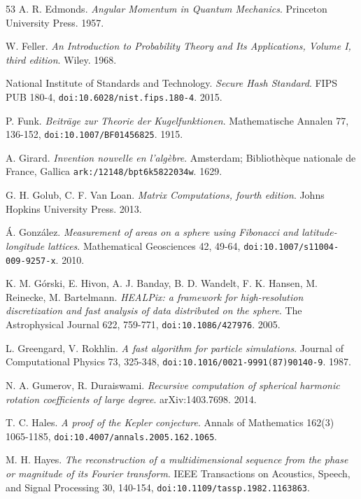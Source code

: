 \begin{thebibliography}{53}
A. R. Edmonds. \emph{Angular Momentum in Quantum Mechanics}. Princeton University Press. 1957.

W. Feller. \emph{An Introduction to Probability Theory and Its Applications, Volume I, third edition}. Wiley. 1968.

National Institute of Standards and Technology. \emph{Secure Hash Standard}. FIPS PUB 180-4, \texttt{doi:10.6028/\allowbreak{}nist.fips.180-4}. 2015.

P. Funk. \emph{Beiträge zur Theorie der Kugelfunktionen}. Mathematische Annalen 77, 136-152, \texttt{doi:10.1007/\allowbreak{}BF01456825}. 1915.

A. Girard. \emph{Invention nouvelle en l'algèbre}. Amsterdam; Bibliothèque nationale de France, Gallica \texttt{ark:/\allowbreak{}12148/\allowbreak{}bpt6k5822034w}. 1629.

G. H. Golub, C. F. Van Loan. \emph{Matrix Computations, fourth edition}. Johns Hopkins University Press. 2013.

Á. González. \emph{Measurement of areas on a sphere using Fibonacci and latitude-longitude lattices}. Mathematical Geosciences 42, 49-64, \texttt{doi:10.1007/\allowbreak{}s11004-009-9257-x}. 2010.

K. M. Górski, E. Hivon, A. J. Banday, B. D. Wandelt, F. K. Hansen, M. Reinecke, M. Bartelmann. \emph{HEALPix: a framework for high-resolution discretization and fast analysis of data distributed on the sphere}. The Astrophysical Journal 622, 759-771, \texttt{doi:10.1086/\allowbreak{}427976}. 2005.

L. Greengard, V. Rokhlin. \emph{A fast algorithm for particle simulations}. Journal of Computational Physics 73, 325-348, \texttt{doi:10.1016/\allowbreak{}0021-9991(87)90140-9}. 1987.

N. A. Gumerov, R. Duraiswami. \emph{Recursive computation of spherical harmonic rotation coefficients of large degree}. arXiv:1403.7698. 2014.

T. C. Hales. \emph{A proof of the Kepler conjecture}. Annals of Mathematics 162(3) 1065-1185, \texttt{doi:10.4007/\allowbreak{}annals.2005.162.1065}.

M. H. Hayes. \emph{The reconstruction of a multidimensional sequence from the phase or magnitude of its Fourier transform}. IEEE Transactions on Acoustics, Speech, and Signal Processing 30, 140-154, \texttt{doi:10.1109/\allowbreak{}tassp.1982.1163863}.


\end{thebibliography}
